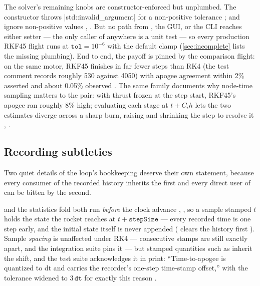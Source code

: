 The solver's remaining knobs are constructor-enforced but unplumbed. The constructor throws
\cppinline|std::invalid_argument| for a non-positive tolerance ;
 and  ignore non-positive values
, . But no path from , the
GUI, or the CLI reaches either setter --- the only caller of  anywhere is a
unit test  --- so every production RKF45 flight runs at
$\mathtt{tol}=10^{-6}$ with the default clamp (\cref{sec:incomplete} lists the missing
plumbing). End to end, the payoff is pinned by the comparison flight: on the same motor, RKF45
finishes in far fewer steps than RK4 (the test comment records roughly 530 against 4050) with
apogee agreement within 2\% asserted and about 0.05\% observed
. The same family documents why node-time sampling
matters to the pair: with thrust frozen at the step start, RKF45's apogee ran roughly 8\% high;
evaluating each stage at $t+C_ih$ lets the two estimates diverge across a sharp burn, raising
 and shrinking the step to resolve it ,
.

\subsection{Recording subtleties}\label{sec:simcore-recording}

Two quiet details of the loop's bookkeeping deserve their own statement, because every consumer
of the recorded history inherits the first and every direct user of  can be
bitten by the second.

\begin{keyinsight}
 and the statistics fold both run \emph{before} the
clock advance , , so a sample stamped
$t$ holds the state the rocket reaches at $t+\mathtt{stepSize}$ --- every recorded time is one
step early, and the initial state itself is never appended
( clears the history first ). Sample \emph{spacing}
is unaffected under RK4 --- consecutive stamps are still exactly  apart, and the
integration suite pins it  --- but stamped
quantities such as
 inherit the shift, and the test suite acknowledges it in print:
``Time-to-apogee is quantized to dt and carries the recorder's one-step time-stamp offset,''
with the tolerance widened to $3\,\mathtt{dt}$ for exactly this reason
.
\end{keyinsight}

